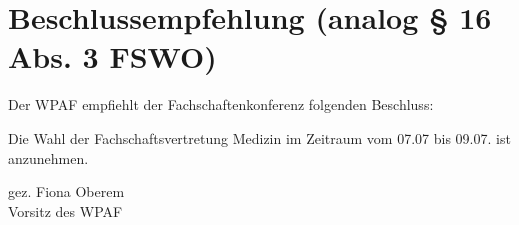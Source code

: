 \documentclass[a4paper]{scrartcl}
\newcommand{\vorsitz}{Fiona Oberem}
\begin{document}
\section*{Beschlussempfehlung (analog § 16 Abs. 3 FSWO)}

Der WPAF empfiehlt der Fachschaftenkonferenz folgenden Beschluss:

\vspace{1em}

Die Wahl der Fachschaftsvertretung Medizin im Zeitraum vom 07.07 bis 09.07. ist anzunehmen.



gez. \vorsitz\\
Vorsitz des WPAF
\end{document}

